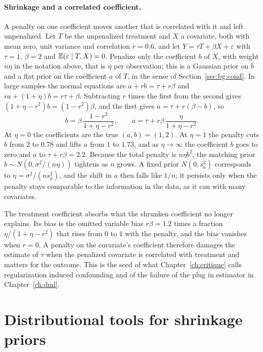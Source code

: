\paragraph{Shrinkage and a correlated coefficient.} A penalty on one coefficient moves another that is correlated with it and left unpenalized. Let $T$ be the unpenalized treatment and $X$ a covariate, both with mean zero, unit variance and correlation $r = 0.6$, and let $Y = \tau T + \beta X + \varepsilon$ with $\tau = 1$, $\beta = 2$ and $\mathbb{E}(\varepsilon \mid T, X) = 0$. Penalize only the coefficient $b$ of $X$, with weight $n\eta$ in the notation above, that is $\eta$ per observation; this is a Gaussian prior on $b$ and a flat prior on the coefficient $a$ of $T$, in the sense of Section~\ref{sec:bg:cond}. In large samples the normal equations are $a + rb = \tau + r\beta$ and $ra + (1 + \eta)b = r\tau + \beta$. Subtracting $r$ times the first from the second gives $(1 + \eta - r^2)b = (1 - r^2)\beta$, and the first gives $a = \tau + r(\beta - b)$, so
\[
b = \beta\,\frac{1 - r^2}{1 + \eta - r^2}, \qquad a = \tau + r\beta\,\frac{\eta}{1 + \eta - r^2}.
\]
At $\eta = 0$ the coefficients are the true $(a, b) = (1, 2)$. At $\eta = 1$ the penalty cuts $b$ from $2$ to $0.78$ and lifts $a$ from $1$ to $1.73$, and as $\eta \to \infty$ the coefficient $b$ goes to zero and $a$ to $\tau + r\beta = 2.2$. Because the total penalty is $n\eta b^2$, the matching prior $b \sim N(0, \sigma^2/(n\eta))$ tightens as $n$ grows. A fixed prior $N(0, s_b^2)$ corresponds to $\eta = \sigma^2/(ns_b^2)$, and the shift in $a$ then falls like $1/n$; it persists only when the penalty stays comparable to the information in the data, as it can with many covariates.

The treatment coefficient absorbs what the shrunken coefficient no longer explains. Its bias is the omitted variable bias $r\beta = 1.2$ times a fraction $\eta/(1 + \eta - r^2)$ that rises from $0$ to $1$ with the penalty, and the bias vanishes when $r = 0$. A penalty on the covariate's coefficient therefore damages the estimate of $\tau$ when the penalized covariate is correlated with treatment and matters for the outcome. This is the seed of what Chapter~\ref{ch:critique} calls regularization induced confounding and of the failure of the plug in estimator in Chapter~\ref{ch:dml}.

\section{Distributional tools for shrinkage priors}\label{app:toolkit}



